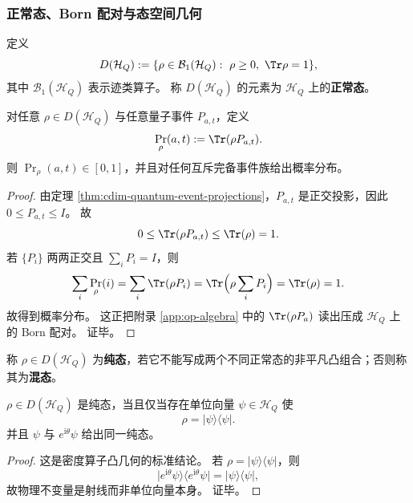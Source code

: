 \subsubsection{正常态、Born 配对与态空间几何}
\begin{definition}[正常态]\label{def:cdim-normal-states}
定义
\[
D(\mathcal H_Q):=
\{\rho\in\mathcal B_1(\mathcal H_Q):\ \rho\ge 0,\ \Tr\rho=1\},
\]
其中 \(\mathcal B_1(\mathcal H_Q)\) 表示迹类算子。
称 \(D(\mathcal H_Q)\) 的元素为 \(\mathcal H_Q\) 上的\textbf{正常态}。
\end{definition}

\begin{theorem}[Born 配对]\label{thm:cdim-born-pairing}
对任意 \(\rho\in D(\mathcal H_Q)\) 与任意量子事件 \(P_{a,t}\)，定义
\[
\Pr_\rho(a,t):=\Tr(\rho P_{a,t}).
\]
则 \(\Pr_\rho(a,t)\in[0,1]\)，并且对任何互斥完备事件族给出概率分布。
\end{theorem}
\begin{proof}
由定理 \ref{thm:cdim-quantum-event-projections}，\(P_{a,t}\) 是正交投影，因此 \(0\le P_{a,t}\le I\)。
故
\[
0\le \Tr(\rho P_{a,t})\le \Tr(\rho)=1.
\]
若 \(\{P_i\}\) 两两正交且 \(\sum_i P_i=I\)，则
\[
\sum_i\Pr_\rho(i)
=
\sum_i\Tr(\rho P_i)
=
\Tr\Bigl(\rho\sum_iP_i\Bigr)
=
\Tr(\rho)=1.
\]
故得到概率分布。
这正把附录 \ref{app:op-algebra} 中的 \(\Tr(\rho P_a)\) 读出压成 \(\mathcal H_Q\) 上的 Born 配对。
证毕。
\end{proof}

\begin{definition}[纯态与混态]\label{def:cdim-pure-mixed-states}
称 \(\rho\in D(\mathcal H_Q)\) 为\textbf{纯态}，若它不能写成两个不同正常态的非平凡凸组合；否则称其为\textbf{混态}。
\end{definition}

\begin{proposition}[纯态的秩一刻画]\label{prop:cdim-pure-states-rank-one}
\(\rho\in D(\mathcal H_Q)\) 是纯态，当且仅当存在单位向量 \(\psi\in\mathcal H_Q\) 使
\[
\rho=\lvert\psi\rangle\langle\psi\rvert.
\]
并且 \(\psi\) 与 \(e^{\mathrm i\theta}\psi\) 给出同一纯态。
\end{proposition}
\begin{proof}
这是密度算子凸几何的标准结论。
若 \(\rho=\lvert\psi\rangle\langle\psi\rvert\)，则
\[
\lvert e^{\mathrm i\theta}\psi\rangle\langle e^{\mathrm i\theta}\psi\rvert
=
\lvert\psi\rangle\langle\psi\rvert,
\]
故物理不变量是射线而非单位向量本身。
证毕。
\end{proof}

